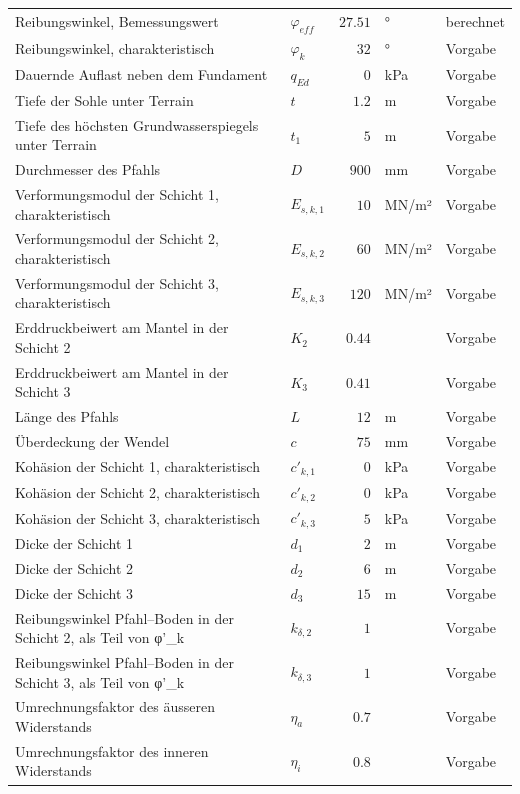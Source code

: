 \documentclass[11pt,a4paper]{article}
\begin{document}
\begin{xltabular}{\linewidth}{>{\raggedright\arraybackslash}Xlrll}
Reibungswinkel, Bemessungswert & $\varphi_{eff}$ & $27.51$ & ° & berechnet \\
Reibungswinkel, charakteristisch & $\varphi_k$ & $32$ & ° & Vorgabe \\
Dauernde Auflast neben dem Fundament & $q_{Ed}$ & $0$ & kPa & Vorgabe \\
Tiefe der Sohle unter Terrain & $t$ & $1.2$ & m & Vorgabe \\
Tiefe des höchsten Grundwasserspiegels unter Terrain & $t_1$ & $5$ & m & Vorgabe \\
Durchmesser des Pfahls & $D$ & $900$ & mm & Vorgabe \\
Verformungsmodul der Schicht 1, charakteristisch & $E_{s,k,1}$ & $10$ & MN/m² & Vorgabe \\
Verformungsmodul der Schicht 2, charakteristisch & $E_{s,k,2}$ & $60$ & MN/m² & Vorgabe \\
Verformungsmodul der Schicht 3, charakteristisch & $E_{s,k,3}$ & $120$ & MN/m² & Vorgabe \\
Erddruckbeiwert am Mantel in der Schicht 2 & $K_{2}$ & $0.44$ &  & Vorgabe \\
Erddruckbeiwert am Mantel in der Schicht 3 & $K_{3}$ & $0.41$ &  & Vorgabe \\
Länge des Pfahls & $L$ & $12$ & m & Vorgabe \\
Überdeckung der Wendel & $c$ & $75$ & mm & Vorgabe \\
Kohäsion der Schicht 1, charakteristisch & $c'_{k,1}$ & $0$ & kPa & Vorgabe \\
Kohäsion der Schicht 2, charakteristisch & $c'_{k,2}$ & $0$ & kPa & Vorgabe \\
Kohäsion der Schicht 3, charakteristisch & $c'_{k,3}$ & $5$ & kPa & Vorgabe \\
Dicke der Schicht 1 & $d_{1}$ & $2$ & m & Vorgabe \\
Dicke der Schicht 2 & $d_{2}$ & $6$ & m & Vorgabe \\
Dicke der Schicht 3 & $d_{3}$ & $15$ & m & Vorgabe \\
Reibungswinkel Pfahl–Boden in der Schicht 2, als Teil von φ'\_k & $k_{\delta,2}$ & $1$ &  & Vorgabe \\
Reibungswinkel Pfahl–Boden in der Schicht 3, als Teil von φ'\_k & $k_{\delta,3}$ & $1$ &  & Vorgabe \\
Umrechnungsfaktor des äusseren Widerstands & $\eta_a$ & $0.7$ &  & Vorgabe \\
Umrechnungsfaktor des inneren Widerstands & $\eta_i$ & $0.8$ &  & Vorgabe \\

\end{xltabular}
\end{document}
